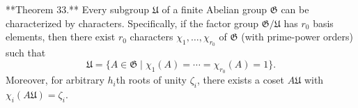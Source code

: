 **Theorem 33.** Every subgroup $\mathfrak{U}$ of a finite Abelian group $\mathfrak{G}$ can be characterized by characters. Specifically, if the factor group $\mathfrak{G}/\mathfrak{U}$ has $r_0$ basis elements, then there exist $r_0$ characters $\chi_1, \ldots, \chi_{r_0}$ of $\mathfrak{G}$ (with prime-power orders) such that
$$\mathfrak{U} = \{ A \in \mathfrak{G} \mid \chi_1(A) = \cdots = \chi_{r_0}(A) = 1 \}.$$
Moreover, for arbitrary $h_i$th roots of unity $\zeta_i$, there exists a coset $A\mathfrak{U}$ with $\chi_i(A\mathfrak{U}) = \zeta_i$.
